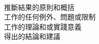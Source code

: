 \begin{flushleft}
{\large {}}\\
\end{flushleft}

推斷結果的原則和概括\\

工作的任何例外、問題或限制\\

工作的理論和或實踐意義\\

得出的結論和建議\\